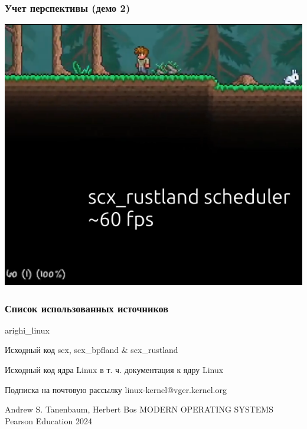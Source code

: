 \documentclass[aspectratio=169]{beamer}
\begin{document}
\begin{frame}
  \frametitle{Учет перспективы (демо 2)}
  \includegraphics[width=0.5\linewidth]{res/D1_2.png}
\end{frame}

\begin{frame}
  \frametitle{Список использованных источников}

  \begin{thebibliography}{20}

     arighi\_linux

     Исходный код scx, scx\_bpfland \& scx\_rustland
    
     Исходный код ядра Linux в т. ч. документация к ядру Linux

     Подписка на почтовую рассылку linux-kernel@vger.kernel.org
  
     Andrew S. Tanenbaum, Herbert Bos MODERN OPERATING SYSTEMS Pearson
    Education 2024

  \end{thebibliography}
\end{frame}
\end{document}
